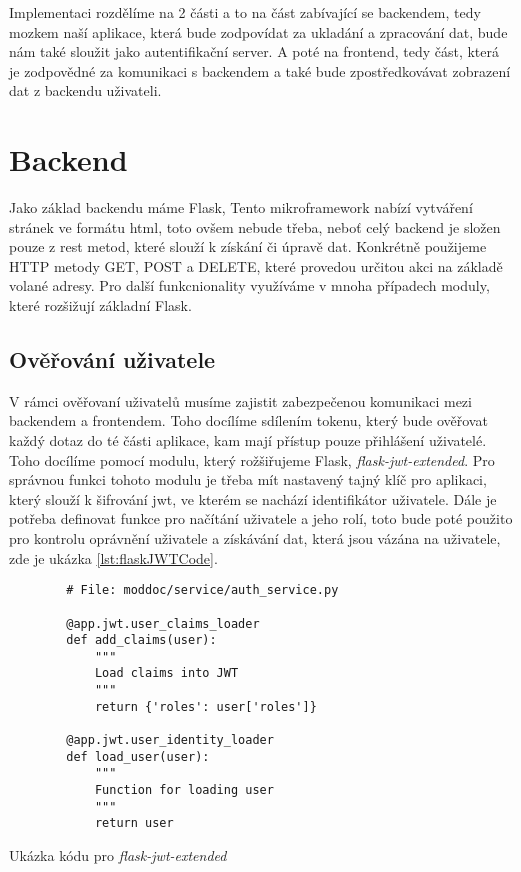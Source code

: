 Implementaci rozdělíme na 2 části a to na část zabívající se backendem, tedy mozkem naší aplikace, která bude zodpovídat
za ukladání a zpracování dat, bude nám také sloužit jako autentifikační server. A poté na frontend, tedy část, která
je zodpovědné za komunikaci s backendem a také bude zpostředkovávat zobrazení dat z backendu uživateli.

\section{Backend}

Jako základ backendu máme Flask,  \cite{flaskDoc}
Tento mikroframework nabízí vytváření stránek ve formátu \gls{html}, toto ovšem nebude třeba, neboť celý backend je složen pouze z rest metod,
které slouží k získání či úpravě dat. Konkrétně použijeme HTTP metody GET, POST a DELETE, které provedou určitou akci na základě volané adresy.
Pro další funkcnionality využíváme v mnoha případech moduly, které rozšižují základní Flask.

\subsection{Ověřování uživatele}

V rámci ověřovaní uživatelů musíme zajistit zabezpečenou komunikaci mezi backendem a frontendem. Toho docílíme sdílením tokenu, který bude ověřovat
každý dotaz do té části aplikace, kam mají přístup pouze přihlášení uživatelé. Toho docílíme pomocí modulu, který rožšiřujeme Flask,
\textit{flask-jwt-extended}. Pro správnou funkci tohoto modulu je třeba mít nastavený tajný klíč pro aplikaci, který slouží k šifrování \gls{jwt},
ve kterém se nachází identifikátor uživatele. Dále je potřeba definovat funkce pro načítání uživatele a jeho rolí, toto bude poté použito pro kontrolu
oprávnění uživatele a získávání dat, která jsou vázána na uživatele, zde je ukázka \ref{lst:flaskJWTCode}.

\begin{listing}
    \begin{verbatim}
        # File: moddoc/service/auth_service.py

        @app.jwt.user_claims_loader
        def add_claims(user):
            """
            Load claims into JWT
            """
            return {'roles': user['roles']}

        @app.jwt.user_identity_loader
        def load_user(user):
            """
            Function for loading user
            """
            return user
    \end{verbatim}
    \caption{Ukázka kódu pro \textit{flask-jwt-extended}}
    \label{lst:flaskJWTCode}
\end{listing}


